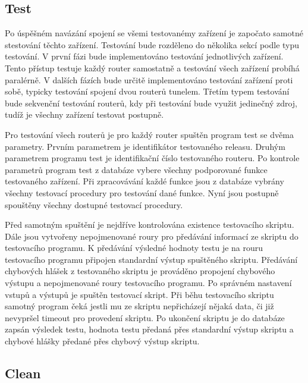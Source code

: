 \subsection{Test}
Po úspěšném navázání spojení se všemi testovanémy zařízení je započato samotné stestování těchto zařízení. Testování bude rozděleno do několika sekcí podle typu testování. V první fázi bude implementováno testování jednotlivých zařízení. Tento přístup testuje každý router samostatně a testování všech zařízení probíhá paralérně. V dalších fázích bude určitě implementováno testování zařízení proti sobě, typicky testování spojení dvou routerů tunelem. Třetím typem testování bude sekvenční testování routerů, kdy při testování bude využit jedinečný zdroj, tudíž je všechny zařízení testovat postupně.

Pro testování všech routerů je pro každý router spuštěn program test se dvěma parametry. Prvním parametrem je identifikátor testovaného releasu. Druhým parametrem programu test je identifikační číslo testovaného routeru. Po kontrole parametrů program test z databáze vybere všechny podporované funkce testovaného zařízení. Při zpracovávání každé funkce jsou z databáze vybrány všechny testovací procedury pro testování dané funkce. Nyní jsou postupně spouštěny všechny dostupné testovací procedury.

Před samotným spuštění je nejdříve kontrolována existence testovacího skriptu. Dále jsou vytvořeny nepojmenované roury pro předávání informací ze skriptu do testovacího programu. K předávání výsledné hodnoty testu je na rouru testovacího programu připojen standardní výstup spuštěného skriptu. Předávání chybových hlášek z testovaného skriptu je prováděno propojení chybového výstupu a nepojmenované roury testovacího programu. Po správném nastavení vstupů a výstupů je spuštěn testovací skript. Při běhu testovacího skriptu samotný program čeká jestli mu ze skriptu nepřicházejí nějaká data, či již nevypršel timeout pro provedení skriptu. Po ukončení skriptu je do databáze zapsán výsledek testu, hodnota testu předaná přes standardní výstup skriptu a chybové hlášky předané přes chybový výstup skriptu. 




\subsection{Clean}


\endinput
